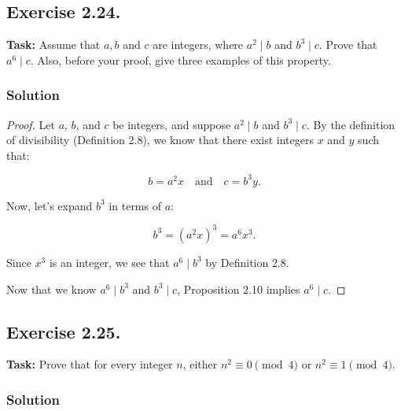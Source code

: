 \documentclass{article}
\begin{document}
\newpage

\subsection{Exercise 2.24.}
\textbf{Task:} Assume that $a,b$ and $c$ are integers, where $a^2\mid b$ and $b^3 \mid c$. Prove that $a^6\mid c$. Also, before your proof, give three examples of this property.

\subsubsection*{Solution}

\begin{proof}
    Let $a$, $b$, and $c$ be integers, and suppose $a^2 \mid b$ and $b^3 \mid c$. By the definition of divisibility (Definition 2.8), we know that there exist integers $x$ and $y$ such that:

    \[
        b = a^2x \quad \text{and} \quad c = b^3y.
    \]

    Now, let’s expand $b^3$ in terms of $a$:

    \[
        b^3 = (a^2x)^3 = a^6x^3.
    \]

    \noindent Since $x^3$ is an integer, we see that $a^6 \mid b^3$ by Definition 2.8.

    \noindent Now that we know $a^6 \mid b^3$ and $b^3 \mid c$, Proposition 2.10 implies $a^6 \mid c$. 
\end{proof}

\subsection{Exercise 2.25.}
\textbf{Task:} Prove that for every integer $n$, either $n^2 \equiv 0 \pmod{4}$ or $n^2 \equiv 1 \pmod{4}$.

\subsubsection*{Solution}
\end{document}
